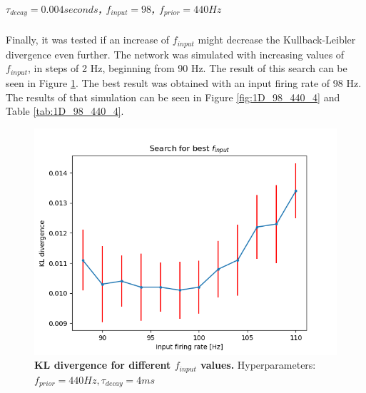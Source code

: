 \subparagraph{$\tau_{decay} = 0.004 seconds$, $f_{input} = 98$, $f_{prior} = 440 Hz$}
Finally, it was tested if an increase of $f_{input}$ might decrease the Kullback-Leibler divergence even further. The network was simulated with increasing values of $f_{input}$, in steps of 2 Hz, beginning from 90 Hz. The result of this search can be seen in Figure \ref{fig:1D_KLD_fPrior440_tau4}. The best result was obtained with an input firing rate of 98 Hz. The results of that simulation can be seen in Figure \ref{fig:1D_98_440_4} and Table \ref{tab:1D_98_440_4}.

\begin{figure}
\centering
  \includegraphics[width=0.75\linewidth]{figures/1D/KLDvsfInput_fPrior440tau4.png}
  \caption{\textbf{KL divergence for different $f_{input}$ values.} Hyperparameters: $f_{prior} = 440 Hz, \tau_{decay} = 4 ms$}
  \label{fig:1D_KLD_fPrior440_tau4}
\end{figure}

